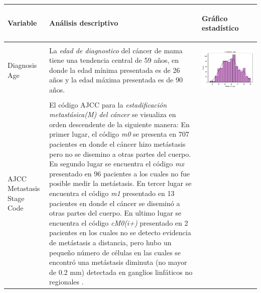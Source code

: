 \begin{table}[htb!]
	\footnotesize
	\begin{threeparttable}
		\begin{tabular}{p{2.5cm} p{7cm} p{6.5cm}} \toprule
			\begin{center}Variable\end{center}   	 
			&\begin{center}Análisis descriptivo\end{center}             
			&\begin{center}Gráfico estadístico\end{center}\\ \hline
			Diagnosis Age
			& La \textit{edad de diagnostico} del cáncer de mama tiene una tendencia central de 59 años, en donde la edad mínima presentada es de  26 años y la edad máxima presentada es de 90 años.
			& \begin{center}\includegraphics[width=1\linewidth]{NOTEBOOK/IMAGENES_DESCRIPTIVAS/1_diagnosis_age}\end{center}
			\\ \hline
			AJCC Metastasis Stage Code 
			& El código AJCC para la \textit{estadificación metastásica(M) del cáncer} se visualiza en orden descendente de la siguiente manera: En primer lugar, el código \textit{m0} se presenta en 707 pacientes en donde el cáncer hizo metástasis pero no se  disemino a otras partes del cuerpo. En segundo lugar se encuentra el código \textit{mx} presentado en 96 pacientes a los cuales no fue posible medir la metástasis. En tercer lugar se encuentra el código \textit{m1} presentado en 13 pacientes en donde el cáncer se diseminó a otras partes del cuerpo. En ultimo lugar se encuentra el código \textit{cM0(i+)} presentado en 2 pacientes en los cuales no se detecto evidencia de metástasis a distancia, pero hubo un pequeño número de células en las cuales se encontró una metástasis diminuta (no mayor de 0.2 mm) detectada en ganglios linfáticos no regionales \cite{NCI}.

\end{tabular}
\end{threeparttable}
\end{table}
